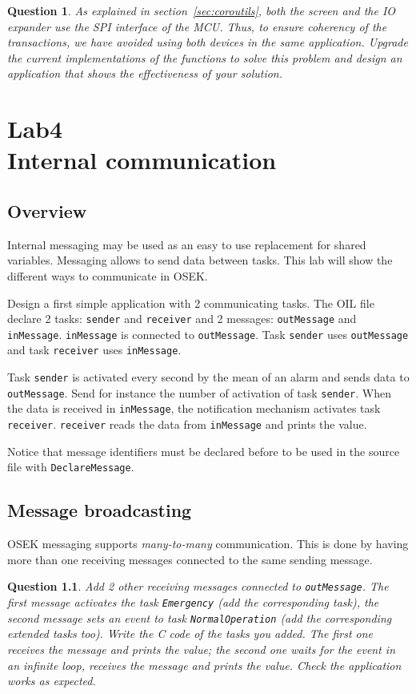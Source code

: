 \documentclass[11pt]{report}
\newtheorem{ex}{Question}
\begin{document}
\begin{ex}
    As explained in section~\ref{sec:coroutils}, both the screen and the IO expander use the SPI interface of the MCU. Thus, to ensure coherency of the transactions, we have avoided using both devices in the same application. Upgrade the current implementations of the functions to solve this problem and design an application that shows the effectiveness of your solution.
\end{ex}

\chapter{Lab4\\Internal communication}

\section{Overview}

Internal messaging may be used as an easy to use replacement for shared variables. Messaging allows to send data between tasks. This lab will show the different ways to communicate in OSEK.

Design a first simple application with 2 communicating tasks.
The OIL file declare 2 tasks: \texttt{sender} and \texttt{receiver} and 2 messages: \texttt{outMessage} and \texttt{inMessage}. \texttt{inMessage} is connected to \texttt{outMessage}. Task \texttt{sender} uses \texttt{outMessage} and task \texttt{receiver} uses \texttt{inMessage}.

Task \texttt{sender} is activated every second by the mean of an alarm and sends data to \texttt{outMessage}.
Send for instance the number of activation of task \texttt{sender}.
When the data is received in \texttt{inMessage}, the notification mechanism activates task \texttt{receiver}.
\texttt{receiver} reads the data from \texttt{inMessage} and prints the value.

Notice that message identifiers must be declared before to be used in the source file with \texttt{DeclareMessage}.

\section{Message broadcasting}

OSEK messaging supports \emph{many-to-many} communication. This is done by having more than one receiving messages connected to the same sending message.
\begin{ex}
Add 2 other receiving messages connected to \texttt{outMessage}. The first message activates the task \texttt{Emergency} (add the corresponding task), the second message sets an event to task \texttt{NormalOperation} (add the corresponding extended tasks too). Write the C code of the tasks you added. The first one receives the message and prints the value; the second one waits for the event in an infinite loop, receives the message and prints the value. Check the application works as expected.
\end{ex}
\end{document}
